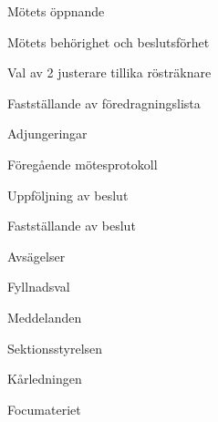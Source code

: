 \documentclass[prelim]{sektionsmote}
\begin{document}
\maketitle

\begin{ootd}

\item{Mötets öppnande}

\item{Mötets behörighet och beslutsförhet}

\item{Val av 2 justerare tillika rösträknare}

\item{Fastställande av föredragningslista}

\item{Adjungeringar}

\item{Föregående mötesprotokoll}

\item{Uppföljning av beslut}

\item{Fastställande av beslut}
\begin{ootd}
    \item Avsägelser
    \item Fyllnadsval
\end{ootd}

\item{Meddelanden}
\begin{ootd}
    \item Sektionsstyrelsen
    \item Kårledningen
    \item Focumateriet
\end{ootd}



\end{ootd}
\end{document}
